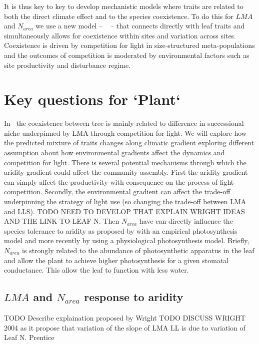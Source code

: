 \documentclass[a4paper,11pt]{article}
\begin{document}
It is thus key to key to develop mechanistic models where traits are related to both the direct climate effect and to the species coexistence. To do this for $LMA$ and $N_{area}$ we use a new model -- \plant\ \citep{Falster-2016,Falster-2017} -- that connects directly with leaf traits and simultaneously allows for coexistence within sites and variation across sites. Coexistence is driven by competition for light in size-structured meta-populations and the outcomes of competition is moderated by environmental factors such as site productivity and disturbance regime.

\section{Key questions for `Plant`}

In \plant\ the coexistence between tree is mainly related to difference in successional niche underpinned by LMA through competition for light. We will explore how the predicted mixture of traits changes along climatic gradient exploring different assumption about how environmental gradients
affect the dynamics and competition for light. There is several
potential mechanisms through which the aridity gradient could
affect the community assembly. First the aridity gradient can simply affect
the productivity with consequence on the process of light
competition. Secondly, the environmental gradient can affect the
trade-off underpinning the strategy of light use (so changing the
trade-off between LMA and LLS). TODO NEED TO DEVELOP THAT EXPLAIN WRIGHT IDEAS AND THE LINK TO LEAF N. Then $N_{area}$ have can directly influence the species tolerance to aridity as proposed by \citet{Wright-2003} with an empirical photosynthesis model and more recently by \citet{Prentice-2014,Dong-2017} using a physiological photosynthesis model. Briefly, $N_{area}$ is strongly related to the abundance of photosynthetic apparatus in the leaf and allow the plant to achieve higher photosynthesis for a given stomatal conductance. This allow the leaf to function with less water.


\subsection{$LMA$ and $N_{area}$ response to aridity}

TODO Describe explaination proposed by Wright 
TODO DISCUSS WRIGHT 2004 as it propose that variation of the slope of LMA LL is due to variation of Leaf N.
Prentice
\end{document}
